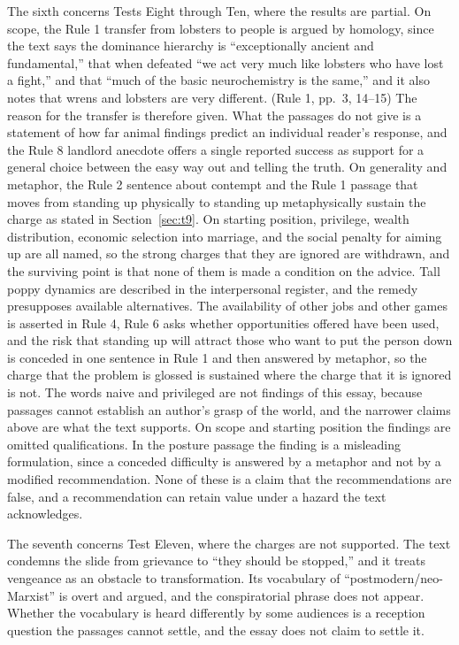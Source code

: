 \documentclass[12pt]{article}
\begin{document}
The sixth concerns Tests Eight through Ten, where the results are partial. On scope, the Rule 1 transfer from lobsters to people is argued by homology, since the text says the dominance hierarchy is ``exceptionally ancient and fundamental,'' that when defeated ``we act very much like lobsters who have lost a fight,'' and that ``much of the basic neurochemistry is the same,'' and it also notes that wrens and lobsters are very different. (Rule 1, pp.~3, 14--15) The reason for the transfer is therefore given. What the passages do not give is a statement of how far animal findings predict an individual reader's response, and the Rule 8 landlord anecdote offers a single reported success as support for a general choice between the easy way out and telling the truth. On generality and metaphor, the Rule 2 sentence about contempt and the Rule 1 passage that moves from standing up physically to standing up metaphysically sustain the charge as stated in Section~\ref{sec:t9}. On starting position, privilege, wealth distribution, economic selection into marriage, and the social penalty for aiming up are all named, so the strong charges that they are ignored are withdrawn, and the surviving point is that none of them is made a condition on the advice. Tall poppy dynamics are described in the interpersonal register, and the remedy presupposes available alternatives. The availability of other jobs and other games is asserted in Rule 4, Rule 6 asks whether opportunities offered have been used, and the risk that standing up will attract those who want to put the person down is conceded in one sentence in Rule 1 and then answered by metaphor, so the charge that the problem is glossed is sustained where the charge that it is ignored is not. The words naive and privileged are not findings of this essay, because passages cannot establish an author's grasp of the world, and the narrower claims above are what the text supports. On scope and starting position the findings are omitted qualifications. In the posture passage the finding is a misleading formulation, since a conceded difficulty is answered by a metaphor and not by a modified recommendation. None of these is a claim that the recommendations are false, and a recommendation can retain value under a hazard the text acknowledges.

The seventh concerns Test Eleven, where the charges are not supported. The text condemns the slide from grievance to ``they should be stopped,'' and it treats vengeance as an obstacle to transformation. Its vocabulary of ``postmodern/neo-Marxist'' is overt and argued, and the conspiratorial phrase does not appear. Whether the vocabulary is heard differently by some audiences is a reception question the passages cannot settle, and the essay does not claim to settle it.
\end{document}
